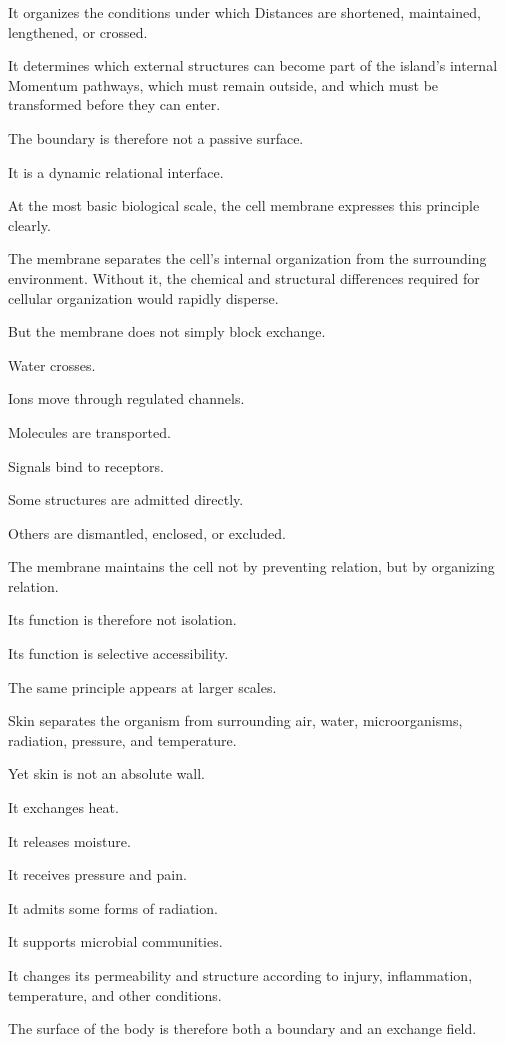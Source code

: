 It organizes the conditions under which Distances are shortened, maintained, lengthened, or crossed.

It determines which external structures can become part of the island’s internal Momentum pathways, which must remain outside, and which must be transformed before they can enter.

The boundary is therefore not a passive surface.

It is a dynamic relational interface.

At the most basic biological scale, the cell membrane expresses this principle clearly.

The membrane separates the cell’s internal organization from the surrounding environment. Without it, the chemical and structural differences required for cellular organization would rapidly disperse.

But the membrane does not simply block exchange.

Water crosses.

Ions move through regulated channels.

Molecules are transported.

Signals bind to receptors.

Some structures are admitted directly.

Others are dismantled, enclosed, or excluded.

The membrane maintains the cell not by preventing relation, but by organizing relation.

Its function is therefore not isolation.

Its function is selective accessibility.

The same principle appears at larger scales.

Skin separates the organism from surrounding air, water, microorganisms, radiation, pressure, and temperature.

Yet skin is not an absolute wall.

It exchanges heat.

It releases moisture.

It receives pressure and pain.

It admits some forms of radiation.

It supports microbial communities.

It changes its permeability and structure according to injury, inflammation, temperature, and other conditions.

The surface of the body is therefore both a boundary and an exchange field.

